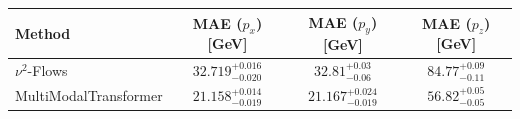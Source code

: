     \begin{tabular}{lccc}
        \toprule
        Method & MAE ($p_x$) [GeV] & MAE ($p_y$) [GeV] & MAE ($p_z$) [GeV] \\
        \midrule
        $\nu^2$-Flows & $32.719^{+0.016}_{-0.020}$ & $32.81^{+0.03}_{-0.06}$ & $84.77^{+0.09}_{-0.11}$ \\
        MultiModalTransformer & $21.158^{+0.014}_{-0.019}$ & $21.167^{+0.024}_{-0.019}$ & $56.82^{+0.05}_{-0.05}$ \\
        \bottomrule
    \end{tabular}